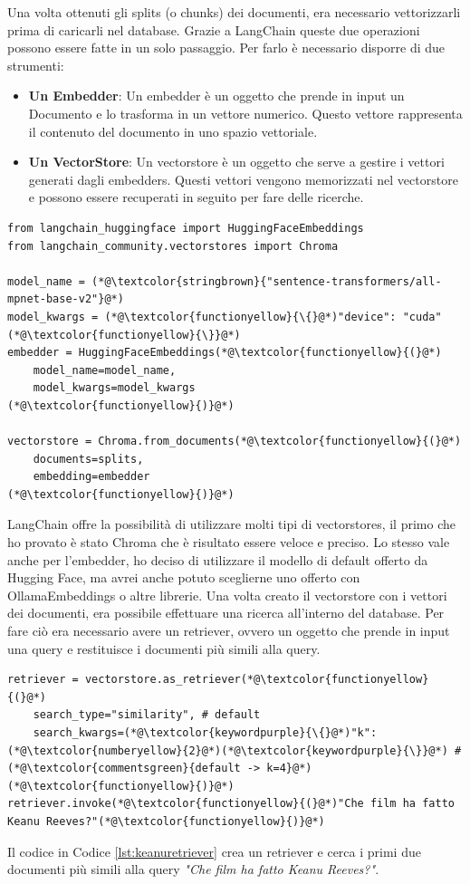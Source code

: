 Una volta ottenuti gli splits (o chunks) dei documenti, era necessario vettorizzarli prima di caricarli nel database. Grazie a LangChain queste due operazioni possono essere fatte in un solo passaggio. Per farlo è necessario disporre di due strumenti:
\begin{itemize}
    \item \textbf{Un Embedder}: Un embedder è un oggetto che prende in input un Documento e lo trasforma in un vettore numerico. Questo vettore rappresenta il contenuto del documento in uno spazio vettoriale.
    \item \textbf{Un VectorStore}: Un vectorstore è un oggetto che serve a gestire i vettori generati dagli embedders. Questi vettori vengono memorizzati nel vectorstore e possono essere recuperati in seguito per fare delle ricerche.
\end{itemize}
\begin{lstlisting}[label=lst:keanuload, caption={Caricamento degli splits sul vectorstore}]
from langchain_huggingface import HuggingFaceEmbeddings
from langchain_community.vectorstores import Chroma

model_name = (*@\textcolor{stringbrown}{"sentence-transformers/all-mpnet-base-v2"}@*)
model_kwargs = (*@\textcolor{functionyellow}{\{}@*)"device": "cuda"(*@\textcolor{functionyellow}{\}}@*)
embedder = HuggingFaceEmbeddings(*@\textcolor{functionyellow}{(}@*)
    model_name=model_name,
    model_kwargs=model_kwargs
(*@\textcolor{functionyellow}{)}@*)

vectorstore = Chroma.from_documents(*@\textcolor{functionyellow}{(}@*)
    documents=splits,
    embedding=embedder
(*@\textcolor{functionyellow}{)}@*)
\end{lstlisting}
LangChain offre la possibilità di utilizzare molti tipi di vectorstores, il primo che ho provato è stato Chroma \cite{chromadb} che è risultato essere veloce e preciso. Lo stesso vale anche per l'embedder, ho deciso di utilizzare il modello di default offerto da Hugging Face, ma avrei anche potuto sceglierne uno offerto con OllamaEmbeddings o altre librerie. Una volta creato il vectorstore con i vettori dei documenti, era possibile effettuare una ricerca all'interno del database. Per fare ciò era necessario avere un retriever, ovvero un oggetto che prende in input una query e restituisce i documenti più simili alla query.
\begin{lstlisting}[label=lst:keanuretriever, caption={Creazione del retriever e primo retrieving}]
retriever = vectorstore.as_retriever(*@\textcolor{functionyellow}{(}@*)
    search_type="similarity", # default
    search_kwargs=(*@\textcolor{keywordpurple}{\{}@*)"k": (*@\textcolor{numberyellow}{2}@*)(*@\textcolor{keywordpurple}{\}}@*) # (*@\textcolor{commentsgreen}{default -> k=4}@*)
(*@\textcolor{functionyellow}{)}@*)
retriever.invoke(*@\textcolor{functionyellow}{(}@*)"Che film ha fatto Keanu Reeves?"(*@\textcolor{functionyellow}{)}@*)
\end{lstlisting}
Il codice in Codice \ref{lst:keanuretriever} crea un retriever e cerca i primi due documenti più simili alla query \textit{"Che film ha fatto Keanu Reeves?"}.

